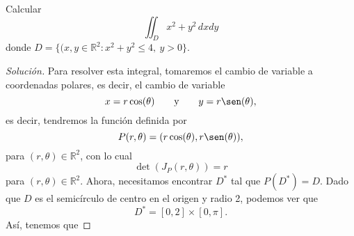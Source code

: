 \documentclass[a4]{aleph-notas-beta}
\begin{document}
\begin{ejer}
    Calcular \[\iint_D x^2+y^2\,dxdy\] donde $D=\{(x,y\in\mathbb{R}^2:x^2+y^2\leq 4,\ y>0\}$.
\end{ejer}

\begin{proof}[Solución]
    Para resolver esta integral, tomaremos el cambio de variable a coordenadas polares, es decir, el cambio de variable
    \[
        x=r\cos(\theta)
        \texty
        y=r\sen(\theta),
    \]
    es decir, tendremos la función definida por
    \[
        P(r,\theta) = (r\cos(\theta) , r\sen(\theta)),
    \]
    para $(r,\theta)\in\mathbb{R}^2$, con lo cual
    \[
        \det(J_P(r,\theta)) = r
    \]
    para $(r,\theta)\in\mathbb{R}^2$. Ahora, necesitamos encontrar $D^*$ tal que $P(D^*)=D$. Dado que $D$ es el semicírculo de centro en el origen y radio 2, podemos ver que
    \[
        D^*=[0,2]\times [0,\pi].
    \]
    Así, tenemos que
\end{proof}
\end{document}
